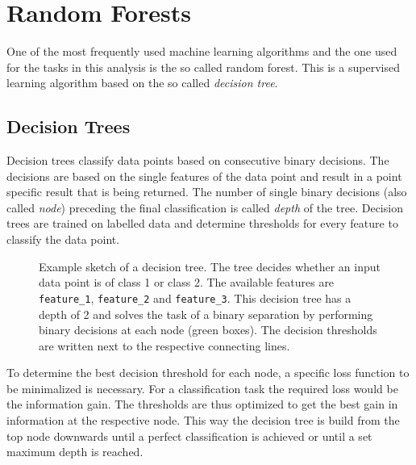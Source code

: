 \section{Random Forests}
%
One of the most frequently used machine learning algorithms and the one used
for the tasks in this analysis is the so called random forest. This is a
supervised learning algorithm based on the so called \textit{decision tree}.

\subsection{Decision Trees}
%
Decision trees classify data points based on consecutive binary decisions. The
decisions are based on the single features of the data point and result in a
point specific result that is being returned. The number of single binary
decisions (also called \textit{node}) preceding the final classification is
called \textit{depth} of the tree. Decision trees are trained on labelled data
and determine thresholds for every feature to classify the data point.
%
\begin{figure}[H]
  \centering
  \caption{Example sketch of a decision tree. The tree decides whether an input data point is of class 1 or class 2. The available features are \texttt{feature\_1}, \texttt{feature\_2} and \texttt{feature\_3}. This decision tree has a depth of 2 and solves the task of a binary separation by performing binary decisions at each node (green boxes). The decision thresholds are written next to the respective connecting lines.}
  \label{fig:tree}
\end{figure}
%
To determine the best decision threshold for each node, a specific loss function
to be minimalized is necessary. For a classification task the required
loss would be the information gain. The thresholds are thus optimized to get the best gain in information at the respective node. This way the decision tree is build from the
top node downwards until a perfect classification is achieved or until a set
maximum depth is reached.

